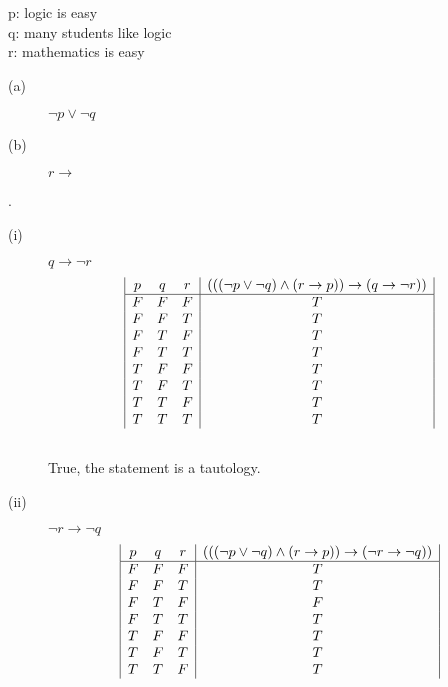 \documentclass[12pt, oneside]{article}
\begin{document}
\begin{enumerate}
\begin{enumerate}[label=(\roman*)]
    p: logic is easy\\
    q: many students like logic\\
    r: mathematics is easy
    \begin{description}
        \item[(a)] $\lnot p \lor \lnot q$
        \item[(b)] $r \rightarrow$ 
    \end{description}
    .
    \begin{description}
        \item[(i)] $q \rightarrow \lnot r$\\
        \begin{displaymath}
            \begin{array}{|c c c|c|}
            p & q & r & (((\lnot p \lor \lnot q) \land (r \rightarrow p)) \rightarrow (q \rightarrow \lnot r))\\
            \hline
            F & F & F & T\\
            F & F & T & T\\
            F & T & F & T\\
            F & T & T & T\\
            T & F & F & T\\
            T & F & T & T\\
            T & T & F & T\\
            T & T & T & T\\
            \end{array}
        \end{displaymath}\\
        True, the statement is a tautology.
        \item[(ii)] $\lnot r \rightarrow \lnot q$\\
        \begin{displaymath}
            \begin{array}{|c c c|c|}
            p & q & r & (((\lnot p \lor \lnot q) \land (r \rightarrow p)) \rightarrow (\lnot r \rightarrow \lnot q))\\
            \hline
            F & F & F & T\\
            F & F & T & T\\
            F & T & F & F\\
            F & T & T & T\\
            T & F & F & T\\
            T & F & T & T\\
            T & T & F & T\\

\end{array}
\end{displaymath}
\end{description}
\end{enumerate}
\end{enumerate}
\end{document}
